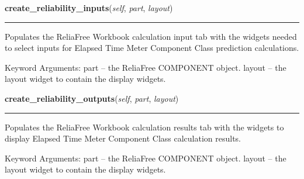     \label{reliafree:meters:meter:ElapsedTime:create_reliability_inputs}

    \vspace{0.5ex}

\hspace{.8\funcindent}\begin{boxedminipage}{\funcwidth}

    \raggedright \textbf{create\_reliability\_inputs}(\textit{self}, \textit{part}, \textit{layout})

    \vspace{-1.5ex}

    \rule{\textwidth}{0.5\fboxrule}
\setlength{\parskip}{2ex}
    Populates the ReliaFree Workbook calculation input tab with the widgets
    needed to select inputs for Elapsed Time Meter Component Class 
    prediction calculations.

    Keyword Arguments: part   -- the ReliaFree COMPONENT object. layout -- 
    the layout widget to contain the display widgets.

\setlength{\parskip}{1ex}
    \end{boxedminipage}

    \label{reliafree:meters:meter:ElapsedTime:create_reliability_outputs}

    \vspace{0.5ex}

\hspace{.8\funcindent}\begin{boxedminipage}{\funcwidth}

    \raggedright \textbf{create\_reliability\_outputs}(\textit{self}, \textit{part}, \textit{layout})

    \vspace{-1.5ex}

    \rule{\textwidth}{0.5\fboxrule}
\setlength{\parskip}{2ex}
    Populates the ReliaFree Workbook calculation results tab with the 
    widgets to display Elapsed Time Meter Component Class calculation 
    results.

    Keyword Arguments: part   -- the ReliaFree COMPONENT object. layout -- 
    the layout widget to contain the display widgets.

\setlength{\parskip}{1ex}
    \end{boxedminipage}

